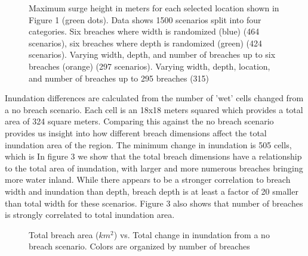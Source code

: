 \documentclass{coastal_paper}
\begin{document}
\begin{figure}[ht]
\centering
\resizebox{\textwidth}{!}{%
        
    }
\caption{Maximum surge height in meters for each selected location shown in Figure 1 (green dots). Data shows 1500 scenarios split into four categories. Six breaches where width is randomized (blue) (464 scenarios), six breaches where depth is randomized (green) (424 scenarios). Varying width, depth, and number of breaches up to six breaches (orange) (297 scenarios). Varying width, depth, location, and number of breaches up to 295 breaches (315)}
\label{fig2}
\end{figure}

Inundation differences are calculated from the number of 'wet' cells changed from a no breach scenario. Each cell is an 18x18 meters squared which provides a total area of 324 square meters. Comparing this against the no breach scenario provides us insight into how different breach dimensions affect the total inundation area of the region. The minimum change in inundation is 505 cells, which is %
In figure 3 we show that the total breach dimensions have a relationship to the total area of inundation, with larger and more numerous breaches bringing more water inland. While there appears to be a stronger correlation to breach width and inundation than depth, breach depth is at least a factor of 20 smaller than total width for these scenarios.
Figure 3 also shows that number of breaches is strongly correlated to total inundation area. 
\begin{figure}[ht]
    \centering
\label{fig3}
\caption{Total breach area ($km^2$) vs. Total change in inundation from a no breach scenario. Colors are organized by number of breaches}
\end{figure}
\end{document}
